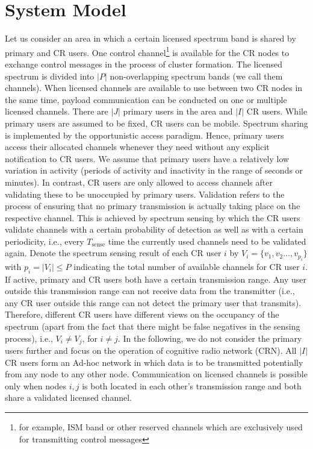 \section{System Model}
\label{sec:model}
Let us consider an area in which a certain licensed spectrum band is shared by primary and CR users.
One control channel\footnote{for example, ISM band or other reserved channels which are exclusively used for transmitting control messages} is available for the CR nodes to exchange control messages in the process of cluster formation.
The licensed spectrum is divided into $|P|$ non-overlapping spectrum bands (we call them channels).
When licensed channels are available to use between two CR nodes in the same time, payload communication can be conducted on one or multiple licensed channels.
There are $|J|$ primary users in the area and $|I|$ CR users. 
While primary users are assumed to be fixed, CR users can be mobile.
Spectrum sharing is implemented by the opportunistic access paradigm.
Hence, primary users access their allocated channels whenever they need without any explicit notification to CR users. 
We assume that primary users have a relatively low variation in activity (periods of activity and inactivity in the range of seconds or minutes).
In contrast, CR users are only allowed to access channels after validating these to be unoccupied by primary users.
Validation refers to the process of ensuring that no primary transmission is actually taking place on the respective channel.
This is achieved by spectrum sensing by which the CR users validate channels with a certain probability of detection as well as with a certain periodicity, i.e., every $T_{\mathrm{sense}}$ time the currently used channels need to be validated again.
Denote the spectrum sensing result of each CR user $i$ by $V_i=\lbrace v_1,v_2\ldots,v_{p_i}\rbrace$ with $p_i=\vert V_i \vert \leq P$ indicating the total number of available channels for CR user $i$. 
If active, primary and CR users both have a certain transmission range.
Any user outside this transmission range can not receive data from the transmitter (i.e., any CR user outside this range can not detect the primary user that transmits). 
Therefore, different CR users have different views on the occupancy of the spectrum (apart from the fact that there might be false negatives in the sensing process), i.e., $V_i \neq V_j$, for $i \neq j$. 
In the following, we do not consider the primary users further and focus on the operation of cognitive radio network (CRN).
All $|I|$ CR users form an Ad-hoc network in which data is to be transmitted potentially from any node to any other node.
Communication on licensed channels is possible only when nodes $i, j$ is both located in each other's transmission range and both share a validated licensed channel.
 
